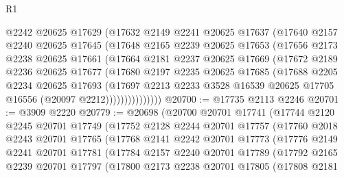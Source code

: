 \begin{lexlean}{R1}
\begin{coremodule}
              @2242
              @20625
              @17629
              (@17632
                @2149
                @2241
                @20625
                @17637
                (@17640
                  @2157
                  @2240
                  @20625
                  @17645
                  (@17648
                    @2165
                    @2239
                    @20625
                    @17653
                    (@17656
                      @2173
                      @2238
                      @20625
                      @17661
                      (@17664
                        @2181
                        @2237
                        @20625
                        @17669
                        (@17672
                          @2189
                          @2236
                          @20625
                          @17677
                          (@17680
                            @2197
                            @2235
                            @20625
                            @17685
                            (@17688
                              @2205
                              @2234
                              @20625
                              @17693
                              (@17697
                                @2213
                                @2233
                                @3528
                                @16539
                                @20625
                                @17705
                                @16556
                                (@20097 @2212)))))))))))))))
@20700 := @17735 @2113 @2246
@20701 := @3909 @2220
@20779 := @20698
    (@20700
      @20701
      @17741
      (@17744
        @2120
        @2245
        @20701
        @17749
        (@17752
          @2128
          @2244
          @20701
          @17757
          (@17760
            @2018
            @2243
            @20701
            @17765
            (@17768
              @2141
              @2242
              @20701
              @17773
              (@17776
                @2149
                @2241
                @20701
                @17781
                (@17784
                  @2157
                  @2240
                  @20701
                  @17789
                  (@17792
                    @2165
                    @2239
                    @20701
                    @17797
                    (@17800
                      @2173
                      @2238
                      @20701
                      @17805
                      (@17808
                        @2181

\end{coremodule}
\end{lexlean}
